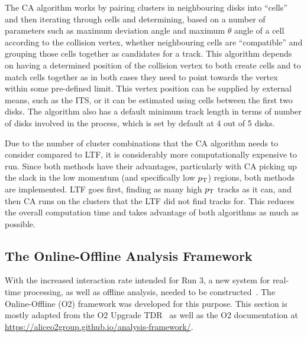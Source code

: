 The CA algorithm works by pairing clusters in neighbouring disks into ``cells'' and then iterating through cells and determining, based on a number of parameters such as maximum deviation angle and maximum $\theta$ angle of a cell according to the collision vertex, whether neighbouring cells are ``compatible'' and grouping those cells together as candidates for a track. This algorithm depends on having a determined position of the collision vertex to both create cells and to match cells together as in both cases they need to point towards the vertex within some pre-defined limit. This vertex position can be supplied by external means, such as the ITS, or it can be estimated using cells between the first two disks. The algorithm also has a default minimum track length in terms of number of disks involved in the process, which is set by default at 4 out of 5 disks. 

Due to the number of cluster combinations that the CA algorithm needs to consider compared to LTF, it is considerably more computationally expensive to run. Since both methods have their advantages, particularly with CA picking up the slack in the low momentum (and specifically low $p_\mathrm{T}$) regions, both methods are implemented. LTF goes first, finding as many high $p_\mathrm{T}$ tracks as it can, and then CA runs on the clusters that the LTF did not find tracks for. This reduces the overall computation time and takes advantage of both algorithms as much as possible. 


\subsection{The Online-Offline Analysis Framework}
With the increased interaction rate intended for Run 3, a new system for real-time processing, as well as offline analysis, needed to be constructed~\cite{ALICE_Upgrade_LOI}. The Online-Offline (O2) framework was developed for this purpose. This section is mostly adapted from the O2 Upgrade TDR~\cite{O2_Upgrade_TDR} as well as the O2 documentation at \url{https://aliceo2group.github.io/analysis-framework/}.

